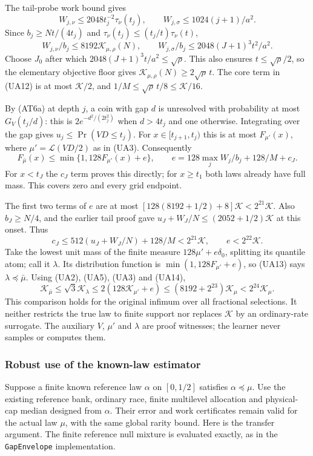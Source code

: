 The tail-probe work bound gives
\[
 W_{j,\nu}\le2048t_j^{-2}\tau_\nu(t_j),
 \qquad W_{j,\sigma}\le1024(j+1)/a^2.
\]
Since $b_j\ge Nt/(4t_j)$ and
$\tau_\nu(t_j)\le(t_j/t)\tau_\nu(t)$,
\[
 W_{j,\nu}/b_j\le8192\mathcal K_{\mu,\rho}(N),\qquad
 W_{j,\sigma}/b_j\le2048(J+1)^3t^2/a^2.                \tag{UA12}
\]
Choose $J_0$ after which
$2048(J+1)^3t/a^2\le\sqrt\rho$. This also ensures
$t\le\sqrt\rho/2$, so the elementary objective floor gives
$\mathcal K_{\mu,\rho}(N)\ge2\sqrt\rho\,t$. The core term in (UA12) is at most
$\mathcal K/2$, and $1/M\le\sqrt\rho\,t/8\le \mathcal K/16$.

By (AT6a) at depth $j$, a coin with gap $d$ is unresolved with probability
at most $G_V(t_j/d)$: this is $2e^{-d^2/(2t_j^2)}$ when $d>4t_j$ and one
otherwise. Integrating over the gap gives $u_j\le\Pr(VD\le t_j)$. For $x\in[t_{j+1},t_j)$ this is at most
$F_{\mu'}(x)$, where $\mu'=\mathcal L(VD/2)$ as in (UA3). Consequently
\[
 F_{\bar\mu}(x)\le\min\{1,128F_{\mu'}(x)+e\},
 \qquad e=128\max_j W_j/b_j+128/M+c_J.                  \tag{UA13}
\]
For $x<t_J$ the $c_J$ term proves this directly; for $x\ge t_1$ both laws
already have full mass. This covers zero and every grid endpoint.

The first two terms of $e$ are at most
$[128(8192+1/2)+8]\mathcal K<2^{21}\mathcal K$. Also $b_J\ge N/4$, and the earlier tail proof
gave $u_J+W_J/N\le(2052+1/2)\mathcal K$ at this onset. Thus
\[
 c_J\le512(u_J+W_J/N)+128/M<2^{21}\mathcal K,
 \qquad e<2^{22}\mathcal K.                                    \tag{UA14}
\]
Take the lowest unit mass of the finite measure $128\mu'+e\delta_0$,
splitting its quantile atom; call it $\lambda$. Its distribution function
is $\min(1,128F_{\mu'}+e)$, so (UA13) says $\lambda\preceq\bar\mu$.
Using (UA2), (UA5), (UA3) and (UA14),
\[
 \mathcal K_{\bar\mu}\le\sqrt3\mathcal K_\lambda
 \le2(128\mathcal K_{\mu'}+e)
 \le(8192+2^{23})\mathcal K_\mu<2^{24}\mathcal K_\mu.
\]
This comparison holds for the original infimum over all fractional
selections. It neither restricts the true law to finite support nor replaces
$\mathcal K$ by an ordinary-rate surrogate. The auxiliary $V$, $\mu'$ and $\lambda$
are proof witnesses; the learner never samples or computes them.

\subsubsection{Robust use of the known-law estimator}

Suppose a finite known reference law $\alpha$ on $[0,1/2]$ satisfies
$\alpha\preceq\mu$. Use the existing reference bank, ordinary race, finite
multilevel allocation and physical-cap median designed from $\alpha$.
Their error and work certificates remain valid for the actual law $\mu$,
with the same global rarity bound. Here is the transfer argument.
The finite reference null mixture is evaluated exactly, as in the
\texttt{GapEnvelope} implementation.

